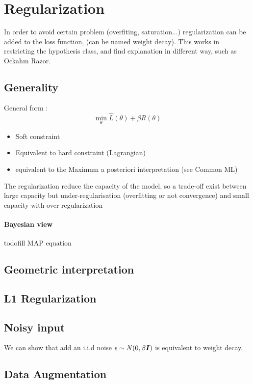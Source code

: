 \section{Regularization}

	In order to avoid certain problem (overfiting, saturation...) regularization can be added to the loss function, (can be named weight decay). This works in restricting the hypothesis class, and find explanation in different way, such as Ockahm Razor. 

	\subsection{Generality}
		General form : 
		\[
			\min_\theta \hat L(\theta) + \beta R(\theta)
		\]
		\begin{itemize}
			\item Soft constraint
			\item Equivalent to hard constraint (Lagrangian)
			\item equivalent to the Maximum a posteriori interpretation (see Common ML)
		\end{itemize}

		The regularization reduce the capacity of the model, so a trade-off exist between large capacity but under-regularisation (overfitting or not convergence) and small capacity with over-regularization

		\paragraph*{Bayesian view}
			todo{fill MAP equation}

	\subsection{Geometric interpretation}

	\subsection{L1 Regularization}

	\subsection{Noisy input}
		We can show that add an i.i.d noise $\epsilon \sim \mathit{N}(0, \beta {\boldsymbol{{I}}})$ is equivalent to weight decay.
	\subsection{Data Augmentation}

